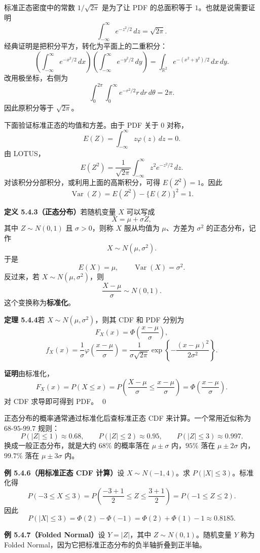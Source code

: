 \documentclass[UTF8,12pt,a4paper,fontset=fandol]{ctexart}
\begin{document}
标准正态密度中的常数 $1/\sqrt{2\pi}$ 是为了让 PDF 的总面积等于 $1$。也就是说需要证明
\[
  \int_{-\infty}^{\infty} e^{-z^2/2}\,dz=\sqrt{2\pi}.
\]
经典证明是把积分平方，转化为平面上的二重积分：
\[
  \left(\int_{-\infty}^{\infty} e^{-x^2/2}\,dx\right)
  \left(\int_{-\infty}^{\infty} e^{-y^2/2}\,dy\right)
  =
  \int_{\mathbb{R}^2}e^{-(x^2+y^2)/2}\,dx\,dy.
\]
改用极坐标，右侧为
\[
  \int_0^{2\pi}\int_0^\infty e^{-r^2/2}r\,dr\,d\theta
  =2\pi.
\]
因此原积分等于 $\sqrt{2\pi}$。

下面验证标准正态的均值和方差。由于 PDF 关于 $0$ 对称，
\[
  E(Z)=\int_{-\infty}^{\infty}z\varphi(z)\,dz=0.
\]
由 LOTUS，
\[
  E(Z^2)=\frac{1}{\sqrt{2\pi}}\int_{-\infty}^{\infty}z^2e^{-z^2/2}\,dz.
\]
对该积分分部积分，或利用上面的高斯积分，可得 $E(Z^2)=1$。因此
\[
  \operatorname{Var}(Z)=E(Z^2)-\{E(Z)\}^2=1.
\]

\noindent\textbf{定义 5.4.3（正态分布）}\quad 若随机变量 $X$ 可以写成
\[
  X=\mu+\sigma Z,
\]
其中 $Z\sim N(0,1)$ 且 $\sigma>0$，则称 $X$ 服从均值为 $\mu$、方差为 $\sigma^2$ 的正态分布，记作
\[
  X\sim N(\mu,\sigma^2).
\]
于是
\[
  E(X)=\mu,\qquad \operatorname{Var}(X)=\sigma^2.
\]
反过来，若 $X\sim N(\mu,\sigma^2)$，则
\[
  \frac{X-\mu}{\sigma}\sim N(0,1).
\]
这个变换称为\textbf{标准化}。

\noindent\textbf{定理 5.4.4}\quad 若 $X\sim N(\mu,\sigma^2)$，则其 CDF 和 PDF 分别为
\[
  F_X(x)=\Phi\left(\frac{x-\mu}{\sigma}\right),
\]
\[
  f_X(x)=\frac{1}{\sigma}\varphi\left(\frac{x-\mu}{\sigma}\right)
  =\frac{1}{\sigma\sqrt{2\pi}}
  \exp\left\{-\frac{(x-\mu)^2}{2\sigma^2}\right\}.
\]

\noindent\textbf{证明}\quad 由标准化，
\[
  F_X(x)=P(X\le x)
  =P\left(\frac{X-\mu}{\sigma}\le \frac{x-\mu}{\sigma}\right)
  =\Phi\left(\frac{x-\mu}{\sigma}\right).
\]
对 CDF 求导即可得到 PDF。
\qed

正态分布的概率通常通过标准化后查标准正态 CDF 来计算。一个常用近似称为 $68$-$95$-$99.7$ 规则：
\[
  P(|Z|\le1)\approx0.68,\qquad
  P(|Z|\le2)\approx0.95,\qquad
  P(|Z|\le3)\approx0.997.
\]
换成一般正态分布，就是大约 $68\%$ 的概率落在 $\mu\pm\sigma$ 内，$95\%$ 落在 $\mu\pm2\sigma$ 内，$99.7\%$ 落在 $\mu\pm3\sigma$ 内。

\noindent\textbf{例 5.4.6（用标准正态 CDF 计算）}\quad 设 $X\sim N(-1,4)$。求 $P(|X|\le3)$。标准化得
\[
  P(-3\le X\le3)
  =
  P\left(\frac{-3+1}{2}\le Z\le \frac{3+1}{2}\right)
  =
  P(-1\le Z\le2).
\]
因此
\[
  P(|X|\le3)=\Phi(2)-\Phi(-1)=\Phi(2)+\Phi(1)-1\approx0.8185.
\]

\noindent\textbf{例 5.4.7（Folded Normal）}\quad 设 $Y=|Z|$，其中 $Z\sim N(0,1)$。随机变量 $Y$ 称为 Folded Normal，因为它把标准正态分布的负半轴折叠到正半轴。
\end{document}
